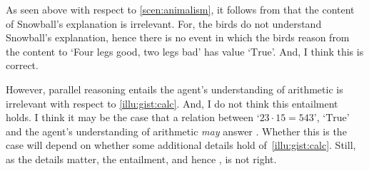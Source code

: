 \begin{note}
  As seen above with respect to \autoref{scen:animalism}, it follows from \issueInclusion{} that the content of Snowball's explanation is irrelevant.
  For, the birds do not understand Snowball's explanation, hence there is no event in which the birds reason from the content to `Four legs good, two legs bad' has value `\(\text{True}\)'.
  And, I think this is correct.

  However, parallel reasoning entails the agent's understanding of arithmetic is irrelevant with respect to \autoref{illu:gist:calc}.
  And, I do not think this entailment holds.
  I think it may be the case that a relation between `\(23 \cdot 15 = 543\)', `\(\text{True}\)' and the agent's understanding of arithmetic \emph{may} answer \qWhy{}.
  Whether this is the case will depend on whether some additional details hold of~\autoref{illu:gist:calc}.
  Still, as the details matter, the entailment, and hence \issueInclusion{}, is not right.
\end{note}

